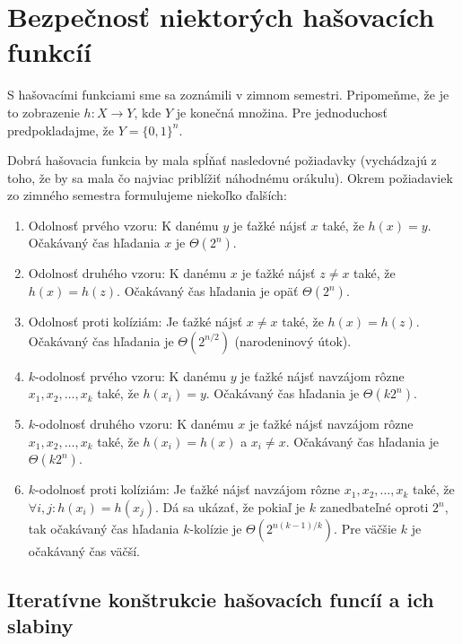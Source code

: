 \section{Bezpečnosť niektorých hašovacích funkcíí}

S hašovacími funkciami sme sa zoznámili v zimnom semestri.
Pripomeňme, že je to zobrazenie $h: X \to Y$, kde $Y$ je konečná množina.
Pre jednoduchosť predpokladajme, že $Y = \{0,1\}^n$. 

Dobrá hašovacia funkcia by mala spĺňať nasledovné požiadavky 
(vychádzajú z toho, že by sa mala čo najviac priblížiť náhodnému orákulu). 
Okrem požiadaviek zo zimného semestra formulujeme niekoľko ďalších:
\begin{enumerate}
    \itemsep -1.2mm
    \item Odolnosť prvého vzoru: K danému $y$ je ťažké nájsť $x$ také, 
        že $h(x) = y$. Očakávaný čas hľadania $x$ je $\Theta(2^n)$.

    \item Odolnosť druhého vzoru: K danému $x$ je ťažké nájsť 
        $z \neq x$ také, že $h(x) = h(z)$. Očakávaný čas hľadania je opäť
        $\Theta(2^n)$.

    \item Odolnosť proti kolíziám: Je ťažké nájsť $x \neq x$ také, 
        že $h(x) = h(z)$. Očakávaný čas hľadania je $\Theta(2^{n/2})$ 
        (narodeninový útok).

    \vskip 0.5cm

    \item $k$-odolnosť prvého vzoru: K danému $y$ je ťažké nájsť navzájom rôzne 
        $x_1, x_2, \dots, x_k$ také, že $h(x_i) = y$. Očakávaný čas hľadania
        je $\Theta(k 2^n)$.

    \item $k$-odolnosť druhého vzoru: K danému $x$ je ťažké nájsť
        navzájom rôzne 
        $x_1, x_2, \dots, x_k$ také, že $h(x_i) = h(x)$ a $x_i \neq x$.
        Očakávaný čas hľadania je $\Theta(k 2^n)$.

    \item $k$-odolnosť proti kolíziám: Je ťažké nájsť navzájom rôzne 
        $x_1, x_2, \dots, x_k$ také, že $\forall i, j\colon h(x_i) = h(x_j)$. 
        Dá sa ukázať, že pokiaľ je $k$ zanedbateľné oproti $2^n$, tak očakávaný 
        čas hľadania $k$-kolízie je $\Theta(2^{n(k-1)/k})$.
        Pre väčšie $k$ je očakávaný čas väčší.
\end{enumerate}

\subsection {Iteratívne konštrukcie hašovacích funcíí a ich slabiny}

